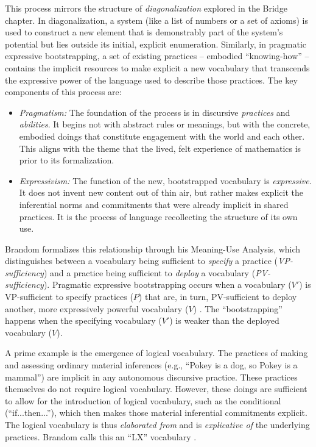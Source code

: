 \documentclass[12pt]{book}
\begin{document}
This process mirrors the structure of \textit{diagonalization} explored in the Bridge chapter. In diagonalization, a system (like a list of numbers or a set of axioms) is used to construct a new element that is demonstrably part of the system's potential but lies outside its initial, explicit enumeration. Similarly, in pragmatic expressive bootstrapping, a set of existing practices -- embodied ``knowing-how'' -- contains the implicit resources to make explicit a new vocabulary that transcends the expressive power of the language used to describe those practices. The key components of this process are:

\begin{itemize}
    \item \textit{Pragmatism:} The foundation of the process is in discursive \textit{practices} and \textit{abilities}. It begins not with abstract rules or meanings, but with the concrete, embodied doings that constitute engagement with the world and each other. This aligns with the theme that the lived, felt experience of mathematics is prior to its formalization.
    \item \textit{Expressivism:} The function of the new, bootstrapped vocabulary is \textit{expressive}. It does not invent new content out of thin air, but rather makes explicit the inferential norms and commitments that were already implicit in shared practices. It is the process of language recollecting the structure of its own use.
\end{itemize}

Brandom formalizes this relationship through his Meaning-Use Analysis, which distinguishes between a vocabulary being sufficient to \textit{specify} a practice (\textit{VP-sufficiency}) and a practice being sufficient to \textit{deploy} a vocabulary (\textit{PV-sufficiency}). Pragmatic expressive bootstrapping occurs when a vocabulary ($V'$) is VP-sufficient to specify practices ($P$) that are, in turn, PV-sufficient to deploy another, more expressively powerful vocabulary ($V$) \parencite[11]{Brandom2008}. The ``bootstrapping'' happens when the specifying vocabulary ($V'$) is weaker than the deployed vocabulary ($V$).

A prime example is the emergence of logical vocabulary. The practices of making and assessing ordinary material inferences (e.g., ``Pokey is a dog, so Pokey is a mammal'') are implicit in any autonomous discursive practice. These practices themselves do not require logical vocabulary. However, these doings are sufficient to allow for the introduction of logical vocabulary, such as the conditional (``if...then...''), which then makes those material inferential commitments explicit. The logical vocabulary is thus \textit{elaborated from} and is \textit{explicative of} the underlying practices. Brandom calls this an ``LX'' vocabulary \parencite[47]{Brandom2008}.
\end{document}
